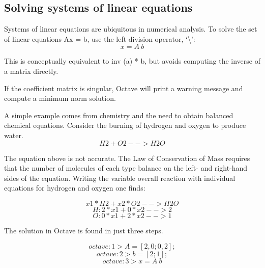 \documentclass[a4paper,12pt]{article}
\begin{document}
\subsection{Solving systems of linear equations}
\justifying
\par
Systems of linear equations are ubiquitous in numerical analysis. To solve the set of linear equations Ax = b, use the left division operator, ‘\textbackslash’:
\begin{equation}
    \label{simple_equation}
	x = A \ b
\end{equation}
\par
This is conceptually equivalent to inv (a) * b, but avoids computing the inverse of a matrix directly.
\par
If the coefficient matrix is singular, Octave will print a warning message and compute a minimum norm solution.
\par
A simple example comes from chemistry and the need to obtain balanced chemical equations. Consider the burning of hydrogen and oxygen to produce water.
\begin{equation}
    \label{simple_equation}
	H2 + O2 --> H2O
\end{equation}
\par
The equation above is not accurate. The Law of Conservation of Mass requires that the number of molecules of each type balance on the left- and right-hand sides of the equation. Writing the variable overall reaction with individual equations for hydrogen and oxygen one finds:

\begin{equation}
    \label{simple_equation}
	x1*H2 + x2*O2 --> H2O
\end{equation}
\begin{equation}
    \label{simple_equation}
	H: 2*x1 + 0*x2 --> 2
\end{equation}
\begin{equation}
    \label{simple_equation}
	O: 0*x1 + 2*x2 --> 1
\end{equation}
\par
The solution in Octave is found in just three steps.

\begin{equation}
    \label{simple_equation}
	octave:1> A = [ 2, 0; 0, 2 ];
\end{equation}
\begin{equation}
    \label{simple_equation}
	octave:2> b = [ 2; 1 ];
\end{equation}
\begin{equation}
    \label{simple_equation}
	octave:3> x = A \ b
\end{equation}
\end{document}
